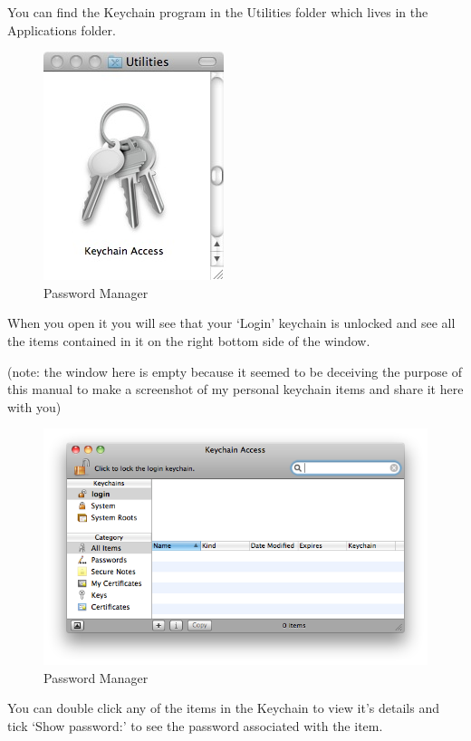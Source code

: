 You can find the Keychain program in the Utilities folder which lives in
the Applications folder.

\begin{figure}[htbp]
\centering
\includegraphics{mng_14.png}
\caption{Password Manager}
\end{figure}

When you open it you will see that your `Login' keychain is unlocked and
see all the items contained in it on the right bottom side of the
window.

(note: the window here is empty because it seemed to be deceiving the
purpose of this manual to make a screenshot of my personal keychain
items and share it here with you)

\begin{figure}[htbp]
\centering
\includegraphics{mng_15.png}
\caption{Password Manager}
\end{figure}

You can double click any of the items in the Keychain to view it's
details and tick `Show password:' to see the password associated with
the item.

